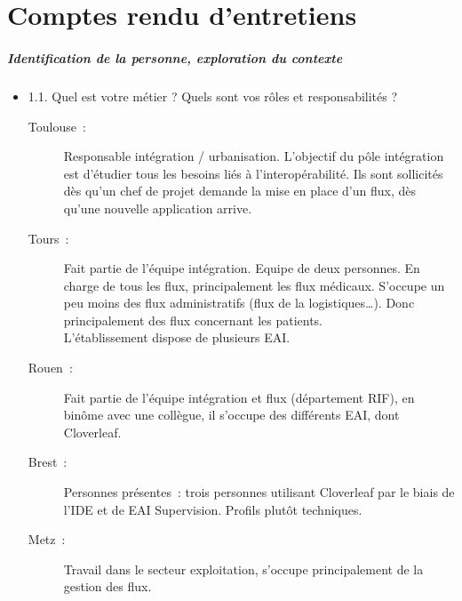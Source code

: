 \tocless\chapter{Comptes rendu d'entretiens}
\paragraph{Identification de la personne, exploration du contexte}
	\begin{itemize}
	  \item 1.1. Quel est votre métier ? Quels sont vos rôles et responsabilités ?
	  \begin{description}
	  	\item[Toulouse~:] Responsable intégration / urbanisation. L’objectif du pôle
	  	intégration est d’étudier tous les besoins liés à l’interopérabilité. Ils
	  	sont sollicités dès qu’un chef de projet demande la mise en place d’un
	  	flux, dès qu’une nouvelle application arrive.
	  	\item[Tours~:] Fait partie de l’équipe intégration. Equipe de deux
	  	personnes.
	  	En charge de tous les flux, principalement les flux médicaux. S’occupe un
	  	peu moins des flux administratifs (flux de la logistiques…). Donc
	  	principalement des flux concernant les patients.\\
		L’établissement dispose de plusieurs EAI.
	  	\item[Rouen~:] Fait partie de l’équipe intégration et flux (département RIF),
	  	en binôme avec une collègue, il s’occupe des différents EAI, dont Cloverleaf.
	  	\item[Brest~:] Personnes présentes~: trois personnes utilisant Cloverleaf
	  	par le biais de l’IDE et de EAI Supervision. Profils plutôt techniques.
	  	\item[Metz~:] Travail dans le secteur exploitation, s’occupe principalement
	  	de la gestion des flux.
	  \end{description}
	  

\end{itemize}
